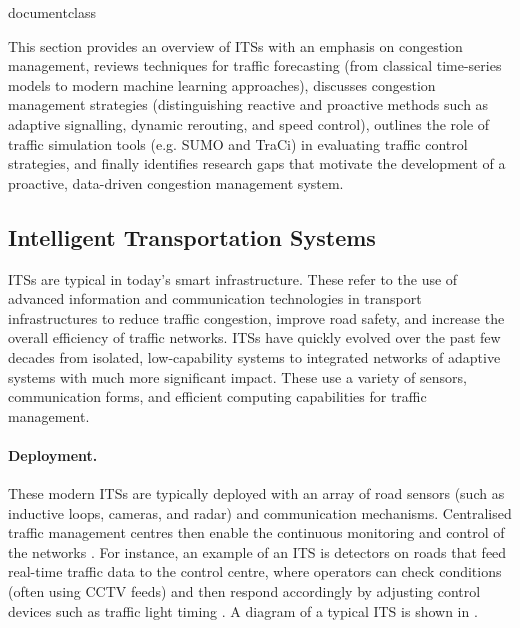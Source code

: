 \csname documentclass
\graphicspath{{\subfix{../images/}}}


This section provides an overview of ITSs with an emphasis on congestion management, reviews techniques for traffic forecasting (from classical time-series models to modern machine learning approaches), discusses congestion management strategies (distinguishing reactive and proactive methods such as adaptive signalling, dynamic rerouting, and speed control), outlines the role of traffic simulation tools (e.g. SUMO and TraCi) in evaluating traffic control strategies, and finally identifies research gaps that motivate the development of a proactive, data-driven congestion management system.

\subsection{Intelligent Transportation Systems}

ITSs are typical in today’s smart infrastructure. These refer to the use of advanced information and communication technologies in transport infrastructures to reduce traffic congestion, improve road safety, and increase the overall efficiency of traffic networks. ITSs have quickly evolved over the past few decades from isolated, low-capability systems to integrated networks of adaptive systems with much more significant impact. These use a variety of sensors, communication forms, and efficient computing capabilities for traffic management.

\paragraph{Deployment.} These modern ITSs are typically deployed with an array of road sensors (such as inductive loops, cameras, and radar) and communication mechanisms. Centralised traffic management centres then enable the continuous monitoring and control of the networks \cite{office_intelligent_nodate}. For instance, an example of an ITS is detectors on roads that feed real-time traffic data to the control centre, where operators can check conditions (often using CCTV feeds) and then respond accordingly by adjusting control devices such as traffic light timing \cite{a_kurdi_review_2014}. A diagram of a typical ITS is shown in .


